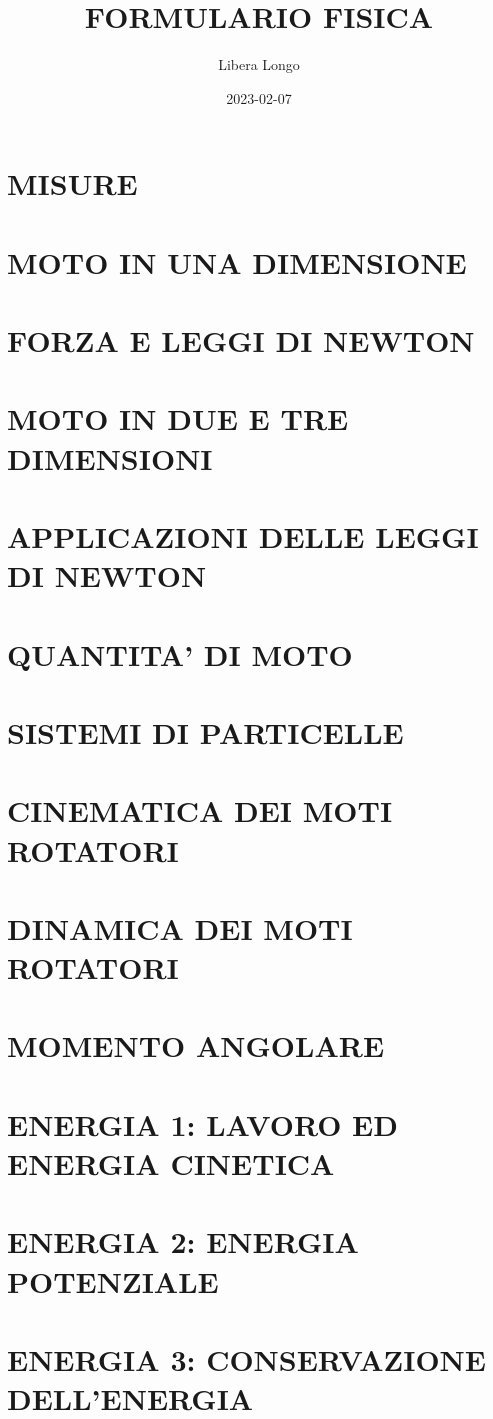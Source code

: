 \documentclass{article}
\title{FORMULARIO FISICA}
\date{2023-02-07}
\author{Libera Longo}
\begin{document}
	\maketitle
	\section{MISURE}
	\section{MOTO IN UNA DIMENSIONE}
	\section{FORZA E LEGGI DI NEWTON}
	\section{MOTO IN DUE E TRE DIMENSIONI}
	\section{APPLICAZIONI DELLE LEGGI DI NEWTON}
	\section{QUANTITA' DI MOTO}
	\section{SISTEMI DI PARTICELLE}
	\section{CINEMATICA DEI MOTI ROTATORI}
	\section{DINAMICA DEI MOTI ROTATORI}
	\section{MOMENTO ANGOLARE}
	\section{ENERGIA 1: LAVORO ED ENERGIA CINETICA}
	\section{ENERGIA 2: ENERGIA POTENZIALE}
	\section{ENERGIA 3: CONSERVAZIONE DELL'ENERGIA}
\end{document}
